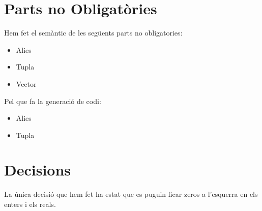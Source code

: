 \documentclass[11pt,a4paper,twoside]{article}
\begin{document}
\section{Parts no Obligatòries}

Hem fet el semàntic de les següents parts no obligatories:
\begin{itemize}
  \item Alies
  \item Tupla
  \item Vector
\end{itemize}

Pel que fa la generació de codi:

\begin{itemize}
  \item Alies
  \item Tupla
\end{itemize}

\section{Decisions}

La única decisió que hem fet ha estat que es puguin ficar zeros a l'esquerra en els enters i els reals.
\end{document}
